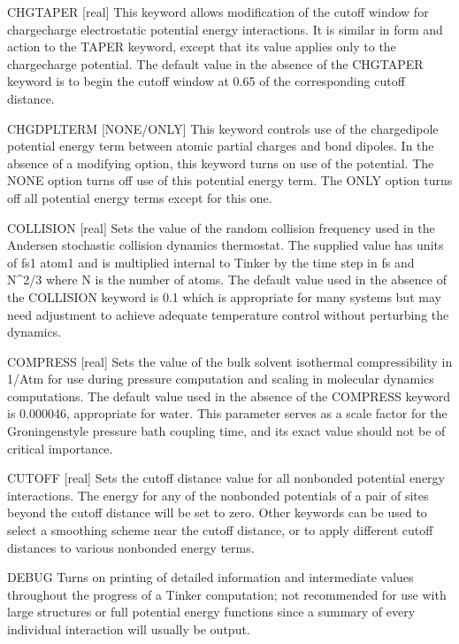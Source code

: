 \documentclass[letterpaper,11pt,english]{sphinxmanual}
\begin{document}
CHG\sphinxhyphen{}TAPER {[}real{]}     This keyword allows modification of the cutoff window for charge\sphinxhyphen{}charge electrostatic potential energy interactions. It is similar in form and action to the TAPER keyword, except that its value applies only to the charge\sphinxhyphen{}charge potential. The default value in the absence of the CHG\sphinxhyphen{}TAPER keyword is to begin the cutoff window at 0.65 of the corresponding cutoff distance.

CHGDPLTERM {[}NONE/ONLY{]}     This keyword controls use of the charge\sphinxhyphen{}dipole potential energy term between atomic partial charges and bond dipoles. In the absence of a modifying option, this keyword turns on use of the potential. The NONE option turns off use of this potential energy term. The ONLY option turns off all potential energy terms except for this one.

COLLISION {[}real{]}     Sets the value of the random collision frequency used in the Andersen stochastic collision dynamics thermostat. The supplied value has units of fs\sphinxhyphen{}1 atom\sphinxhyphen{}1 and is multiplied internal to Tinker by the time step in fs and N\textasciicircum{}2/3 where N is the number of atoms. The default value used in the absence of the COLLISION keyword is 0.1 which is appropriate for many systems but may need adjustment to achieve adequate temperature control without perturbing the dynamics.

COMPRESS {[}real{]}     Sets the value of the bulk solvent isothermal compressibility in 1/Atm for use during pressure computation and scaling in molecular dynamics computations. The default value used in the absence of the COMPRESS keyword is 0.000046, appropriate for water. This parameter serves as a scale factor for the Groningen\sphinxhyphen{}style pressure bath coupling time, and its exact value should not be of critical importance.

CUTOFF {[}real{]}     Sets the cutoff distance value for all nonbonded potential energy interactions. The energy for any of the nonbonded potentials of a pair of sites beyond the cutoff distance will be set to zero. Other keywords can be used to select a smoothing scheme near the cutoff distance, or to apply different cutoff distances to various nonbonded energy terms.

DEBUG     Turns on printing of detailed information and intermediate values throughout the progress of a Tinker computation; not recommended for use with large structures or full potential energy functions since a summary of every individual interaction will usually be output.
\end{document}
